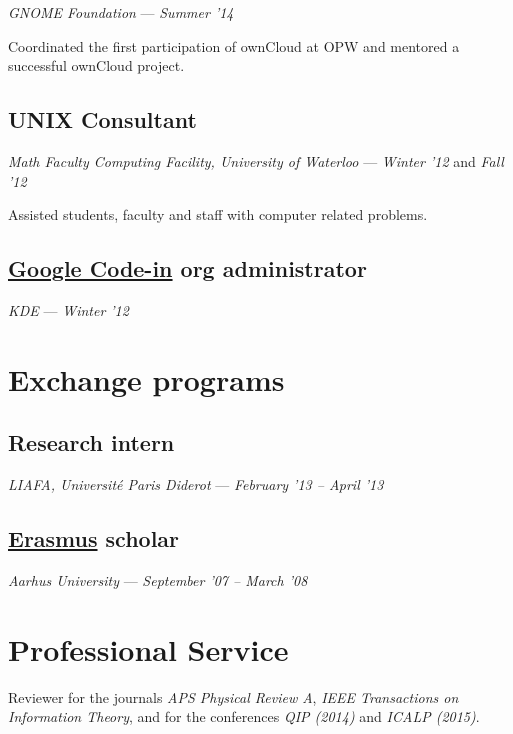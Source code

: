 \documentclass[]{article}
\begin{document}
\emph{GNOME Foundation} --- \emph{Summer '14}

Coordinated the first participation of ownCloud at OPW and mentored a
successful ownCloud project.

\subsection{UNIX Consultant}\label{unix-consultant}

\emph{Math Faculty Computing Facility, University of Waterloo} ---
\emph{Winter '12} and \emph{Fall '12}

Assisted students, faculty and staff with computer related problems.

\subsection{\href{https://www.google-melange.com/gci/homepage/google/gci2012}{Google
Code-in} org
administrator}\label{google-code-incodein-org-administrator}

\emph{KDE} --- \emph{Winter '12}

\section{Exchange programs}\label{exchange-programs}

\subsection{Research intern}\label{research-intern}

\emph{LIAFA, Université Paris Diderot} --- \emph{February '13 -- April
'13}

\subsection{\href{http://en.wikipedia.org/wiki/Erasmus_Programme}{Erasmus}
scholar}\label{erasmus-scholar}

\emph{Aarhus University} --- \emph{September '07 -- March '08}

\section{Professional Service}\label{professional-service}

Reviewer for the journals \emph{APS Physical Review A}, \emph{IEEE
Transactions on Information Theory}, and for the conferences \emph{QIP
(2014)} and \emph{ICALP (2015)}.
\end{document}
